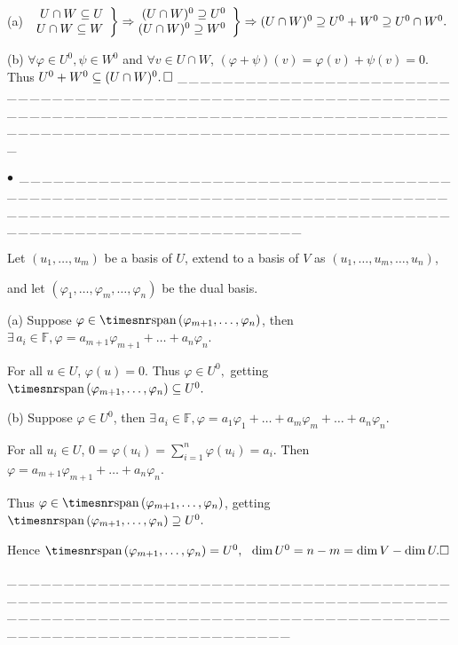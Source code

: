 \documentclass[a4paper, 11pt, UTF8]{article}
\def\Spn{{\timesnr\textup{span}}\,}
\def\Fbb{{\mathbb{F}}}
\def\BulletPoint{{\small$\bullet$}}
\def\Ha{\quad\hspace{8pt}}
\def\Hb{\quad\hspace{8.7pt}}
\def\ProblemEnding{{\tiny \_\,\_\,\_\,\_\,\_\,\_\,\_\,\_\,\_\,\_\,\_\,\_\,\_\,\_\,\_\,\_\,\_\,\_\,\_\,\_\,\_\,\_\,\_\,\_\,\_\,\_\,\_\,\_\,\_\,\_\,\_\,\_\,\_\,\_\,\_\,\_\,\_\,\_\,\_\,\_\,\_\,\_\,\_\,\_\,\_\,\_\,\_\,\_\,\_\,\_\,\_\,\_\,\_\,\_\,\_\,\_\,\_\,\_\,\_\,\_\,\_\,\_\,\_\,\_\,\_\,\_\,\_\,\_\,\_\,\_\,\_\_\,\_\,\_\,\_\,\_\,\_\,\_\,\_\,\_\,\_\,\_\,\_\,\_\,\_\,\_\,\_\,\_\,\_\,\_\,\_\,\_\,\_\,\_\,\_\,\_\,\_\,\_\,\_\,\_\,\_\,\_\,\_\,\_\,\_\,\_\,\_\,\_\,\_\,\_\,\_\,\_\,\_\,\_\,\_\,\_\,\_\,\_\,\_\,\_\,\_\,\_\,\_\,\_\,\_\,\_\,\_\,\_\,\_\,\_\,\_\,\_\,\_\,\_\,\_\,\_\,\_\,\_\,\_\,\_\,\_\,\_}}
\begin{document}
\begin{large}
\par\quad
(a) $\MathRightBrace{r}{U\cap W\subseteq U\\U\cap W\subseteq W}\Rightarrow\hspace{-6pt}\MathRightBrace{r}{(U\cap W)^0\supseteq U^0 \\ (U\cap W)^0\supseteq W^0}\Rightarrow(U\cap W)^0\supseteq U^0+W^0\supseteq U^0\cap W^0.$\par\vspace{6pt}\quad
(b) $\forall\varphi\in U^0,\psi\in W^0$ and $\forall v\in U\cap W$, $(\varphi+\psi)(v)=\varphi(v)+\psi(v)=0$. Thus $U^0+W^0\subseteq (U\cap W)^0.\,\hfill\square$
\ProblemEnding\par

\BulletPoint\, \Corollary\;\;
\ProblemEnding\par

\par\quad
Let $(u_1,\dots,u_m)$ be a basis of $U$, extend to a basis of $V$ as $(u_1,\dots,u_m,\dots,u_n)$,\par\quad
and let $(\varphi_1,\dots,\varphi_m,\dots,\varphi_n)$ be the dual basis.\par\quad
(a) Suppose $\varphi\in\Spn(\varphi_{m+1},\dots,\varphi_n)$, then $\exists\,a_i\in\Fbb,\varphi=a_{m+1}\varphi_{m+1}+\dots+a_n\varphi_n.$\par\quad\Ha
For all $u\in U$, $\varphi(u)=0$. Thus $\varphi\in U^0,$ getting $\Spn(\varphi_{m+1},\dots,\varphi_n)\subseteq U^0.$\par\quad
(b) Suppose $\varphi\in U^0$, then $\exists\,a_i\in\Fbb,\varphi=a_1\varphi_1+\dots+a_m\varphi_m+\dots+a_n\varphi_n.$\par\quad\Hb
For all $u_i\in U$, $0=\varphi(u_i)=\sum\limits_{i=1}^n \varphi(u_i)=a_i$. Then $\varphi=a_{m+1}\varphi_{m+1}+\dots+a_n\varphi_n.$\par\quad\Hb
Thus $\varphi\in\Spn(\varphi_{m+1},\dots,\varphi_n)$, getting $\Spn(\varphi_{m+1},\dots,\varphi_n)\supseteq U^0.$\par\quad
Hence $\Spn(\varphi_{m+1},\dots,\varphi_n)=U^0,\,\,\,\,\dim U^0=n-m=\dim V-\dim U.\hfill\square$\par
\ProblemEnding\par


\end{large}
\end{document}
